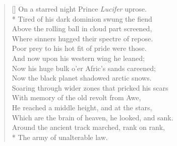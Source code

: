 \documentclass[MAIN]{subfiles}
\begin{document}
\settowidth{\versewidth}{Which are the brain of heaven, he looked, and sank.}
\begin{verse}[\versewidth]
On a starred night Prince \emph{Lucifer} uprose.\\*
\vin Tired of his dark dominion swung the fiend\\
\vin Above the rolling ball in cloud part screened,\\
Where sinners hugged their spectre of repose.\\
Poor prey to his hot fit of pride were those.\\
\vin And now upon his western wing he leaned;\\
\vin Now his huge bulk o'er Afric's sands careened;\\
Now the black planet shadowed arctic snows.\\
Soaring through wider zones that pricked his scars\\
\vin With memory of the old revolt from Awe,\\
He reached a middle height, and at the stars,\\
\vin \vin Which are the brain of heaven, he looked, and sank.\\
\vin \vin Around the ancient track marched, rank on rank,\\*
\vin The army of unalterable law.
\end{verse}
\end{document}
